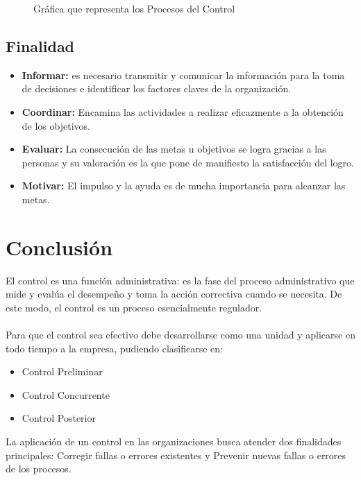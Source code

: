 \documentclass[12pt,letterpaper]{article}
\begin{document}
\begin{figure}[ht]
\centering
{}
\caption{Gráfica que representa los Procesos del Control}
\end{figure}
\subsection{Finalidad}
\begin{itemize}
\item \textbf{Informar:} es necesario transmitir y comunicar la información para la toma de decisiones e identificar los factores claves de la organización.
\item \textbf{Coordinar:} Encamina las actividades a realizar eficazmente a la obtención de los objetivos.
\item \textbf{Evaluar:} La consecución de las metas u objetivos se logra gracias a las personas y su valoración es la que pone de manifiesto la satisfacción del logro.
\item \textbf{Motivar:} El impulso y la ayuda es de mucha importancia para alcanzar las metas.
\end{itemize}

\section{Conclusión}
El control es una función administrativa: es la fase del proceso administrativo que mide y evalúa el desempeño y toma la acción correctiva cuando se necesita. De este modo, el control es un proceso esencialmente regulador. \\${ }$\\
Para que el control sea efectivo debe desarrollarse como una unidad y aplicarse en todo tiempo a la empresa, pudiendo clasificarse en: 
\begin{itemize}
\item Control Preliminar
\item Control Concurrente 
\item Control Posterior
\end{itemize}
La aplicación de un control en las organizaciones busca atender dos finalidades principales: Corregir fallas o errores existentes y Prevenir nuevas fallas o errores de los procesos. 
\end{document}
